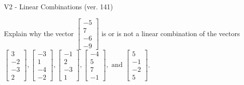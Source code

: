 \begin{exercise}
  \begin{exerciseTitle}V2 - Linear Combinations (ver. 141)\end{exerciseTitle}
  \begin{exerciseStatement}
    Explain why the vector \(\left[\begin{array}{c}
-5 \\
7 \\
-6 \\
-9
\end{array}\right]\)  is or is not a linear 
	combination of the vectors \(\left[\begin{array}{c}
3 \\
-2 \\
-3 \\
2
\end{array}\right] , \left[\begin{array}{c}
-3 \\
1 \\
-4 \\
-2
\end{array}\right] , \left[\begin{array}{c}
-1 \\
2 \\
-3 \\
1
\end{array}\right] , \left[\begin{array}{c}
-4 \\
5 \\
7 \\
-1
\end{array}\right] , \text{ and } \left[\begin{array}{c}
5 \\
-1 \\
-2 \\
5
\end{array}\right]\).
	



\end{exerciseStatement}
\end{exercise}
